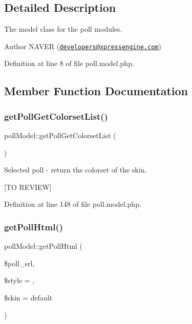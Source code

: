 \subsection{Detailed Description}
The model class for the poll modules. 

\begin{DoxyAuthor}{Author}
N\+A\+V\+ER (\href{mailto:developers@xpressengine.com}{\tt developers@xpressengine.\+com}) 
\end{DoxyAuthor}


Definition at line 8 of file poll.\+model.\+php.



\subsection{Member Function Documentation}
\hypertarget{classpollModel_a350de71f668751cd553fc60aca3fa72c}{}\label{classpollModel_a350de71f668751cd553fc60aca3fa72c} 
\subsubsection{\texorpdfstring{get\+Poll\+Get\+Colorset\+List()}{getPollGetColorsetList()}}
{\footnotesize\ttfamily poll\+Model\+::get\+Poll\+Get\+Colorset\+List (\begin{DoxyParamCaption}{ }\end{DoxyParamCaption})}



Selected poll -\/ return the colorset of the skin. 

\mbox{[}TO R\+E\+V\+I\+EW\mbox{]} 

Definition at line 148 of file poll.\+model.\+php.

\hypertarget{classpollModel_a75ba9768f206d9467f997beeb8c3e34e}{}\label{classpollModel_a75ba9768f206d9467f997beeb8c3e34e} 
\subsubsection{\texorpdfstring{get\+Poll\+Html()}{getPollHtml()}}
{\footnotesize\ttfamily poll\+Model\+::get\+Poll\+Html (\begin{DoxyParamCaption}\item[{}]{\$poll\+\_\+srl,  }\item[{}]{\$style = {\ttfamily \textquotesingle{}\textquotesingle{}},  }\item[{}]{\$skin = {\ttfamily \textquotesingle{}default\textquotesingle{}} }\end{DoxyParamCaption})}



